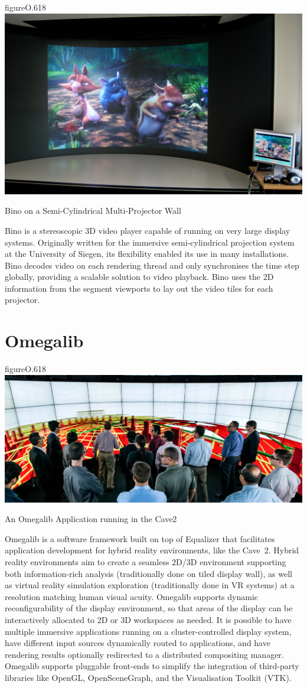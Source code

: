 \begin{wrapfloat}{figure}{O}{.618\textwidth}
  \includegraphics[width=.618\textwidth]{images/bino}
  {\caption{\label{fBino}Bino on a Semi-Cylindrical Multi-Projector Wall}}
\end{wrapfloat}

Bino is a stereoscopic 3D video player capable of running on very large display
systems. Originally written for the immersive semi-cylindrical projection
system at the University of Siegen, its flexibility enabled its use in many
installations. Bino decodes video on each rendering thread and only
synchronises the time step globally, providing a scalable solution to video
playback. Bino uses the 2D information from the segment viewports to lay out
the video tiles for each projector.

\section{Omegalib}

\begin{wrapfloat}{figure}{O}{.618\textwidth}
  \includegraphics[width=.618\textwidth]{images/omegalib}
  {\caption{\label{fOmegalib}An Omegalib Application running in the Cave2}}
\end{wrapfloat}

Omegalib \cite{Omegalib} is a software framework built on top of Equalizer that
facilitates application development for hybrid reality environments, like the
Cave~2. Hybrid reality environments aim to create a seamless 2D/3D environment
supporting both information-rich analysis (traditionally done on tiled
display wall), as well as virtual reality simulation exploration (traditionally
done in VR systems) at a resolution matching human visual acuity. Omegalib
supports dynamic reconfigurability of the display environment, so that areas of
the display can be interactively allocated to 2D or 3D workspaces as needed. It
is possible to have multiple immersive applications running on a
cluster-controlled display system, have different input sources dynamically
routed to applications, and have rendering results optionally redirected to a
distributed compositing manager. Omegalib supports pluggable front-ends to
simplify the integration of third-party libraries like OpenGL, OpenSceneGraph,
and the Visualisation Toolkit (VTK).



